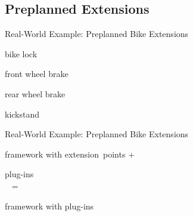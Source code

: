 \subsection{Preplanned Extensions}
\begin{frame}{Real-World Example: Preplanned Bike Extensions}
	\begin{mycolumns}[columns=4,T]
		\centering{}

		bike lock
	\mynextcolumn
		\centering{}

		front wheel brake
	\mynextcolumn
		\centering{}

		rear wheel brake
	\mynextcolumn
		\centering{}

		kickstand
	\end{mycolumns}
\end{frame}

\begin{frame}{Real-World Example: Preplanned Bike Extensions}
	\begin{mycolumns}[columns=5,widths={30,5,30,5,30}]
		\centering{}

		framework with extension~points
	\mynextcolumn
		\centering\Huge +
	\mynextcolumn
		\centering{}

		plug-ins\\~
	\mynextcolumn
		\centering\Huge =
	\mynextcolumn
		\centering{}

		framework with plug-ins\\~
	\end{mycolumns}
\end{frame}

